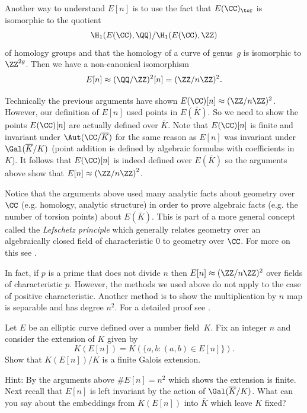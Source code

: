 Another way to understand $E[n]$ is to use the fact
that $E(\CC)_{\tor}$ is isomorphic
to the quotient
\[\H_1(E(\CC),\QQ)/\H_1(E(\CC),\ZZ)\]
of homology groups and that the homology of a curve
of genus~$g$ is isomorphic to $\ZZ^{2g}$.
Then we have a non-canonical isomorphism
\[
  E[n]\approx (\QQ/\ZZ)^2[n] = (\ZZ/n\ZZ)^2.
\]

Technically the previous arguments have shown $E(\CC)[n] \approx (\ZZ/n\ZZ)^2$.
However, our definition of $E[n]$ used points in $E(\overline{K})$.
So we need to show the points $E(\CC)[n]$ are actually defined over
$\overline{K}$. Note that $E(\CC)[n]$ is finite and invariant under
$\Aut(\CC/\overline{K})$ for the same reason as $E[n]$ was invariant under
$\Gal(\overline{K}/K)$ (point addition is defined by algebraic formulas with
coefficients in $K$). It follows that $E(\CC)[n]$ is indeed defined over 
$E(\overline{K})$ so the arguments above show that
$E[n] \approx \left(\ZZ/n\ZZ\right)^2$.

\begin{remark}
  Notice that the arguments above used many analytic facts about
  geometry over $\CC$ (e.g. homology, analytic structure) in order to
  prove algebraic facts (e.g. the number of torsion points) about
  $E(\overline{K})$. This is part of a more general concept called the
  \emph{Lefschetz principle} which generally relates geometry over an
  algebraically closed field of characteristic $0$ to geometry over
  $\CC$. For more on this see \cite[Ch.~VI.6]{silverman:aec}.
\end{remark}

\begin{remark}
  In fact, if $p$ is a prime that does not divide $n$
  then $E[n] \approx (\ZZ/n\ZZ)^2$ over fields of characteristic
  $p$. However, the methods we used above do not apply
  to the case of positive characteristic. Another method is to
  show the multiplication by $n$ map is separable and has
  degree $n^2$. For a detailed proof see
  \cite[Cor.~III.6.4]{silverman:aec}.
\end{remark}

\begin{exercise}\label{QE[p]finitegaloisext}
  Let $E$ be an elliptic curve defined over a number
  field~$K$. Fix an integer $n$ and consider the
  extension of $K$ given by
  \[
    K(E[n]) = K(\{a,b \colon (a,b) \in E[n]\}).
  \]
  Show that $K(E[n])/K$ is a finite Galois extension.
  
  Hint: By the arguments above $\#E[n] = n^2$ which shows
  the extension is finite. Next recall that $E[n]$ is left
  invariant by the action of $\Gal(\overline{K}/K)$. What
  can you say about the embeddings from $K(E[n])$ into
  $\overline{K}$ which leave $K$ fixed?
\end{exercise}


